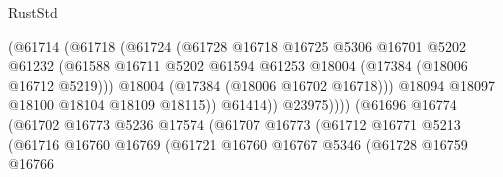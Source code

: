 \begin{lexlean}{RustStd}
\begin{coremodule}
                                            (@61714
                                              (@61718
                                                (@61724
                                                  (@61728
                                                    @16718
                                                    @16725
                                                    @5306
                                                    @16701
                                                    @5202
                                                    @61232
                                                    (@61588
                                                      @16711
                                                      @5202
                                                      @61594
                                                      @61253
                                                      @18004
                                                      (@17384 (@18006 @16712 @5219)))
                                                    @18004
                                                    (@17384 (@18006 @16702 @16718)))
                                                  @18094
                                                  @18097
                                                  @18100
                                                  @18104
                                                  @18109
                                                  @18115))
                                              @61414))
                                          @23975))))
                                  (@61696
                                    @16774
                                    (@61702
                                      @16773
                                      @5236
                                      @17574
                                      (@61707
                                        @16773
                                        (@61712
                                          @16771
                                          @5213
                                          (@61716
                                            @16760
                                            @16769
                                            (@61721
                                              @16760
                                              @16767
                                              @5346
                                              (@61728
                                                @16759
                                                @16766

\end{coremodule}
\end{lexlean}
